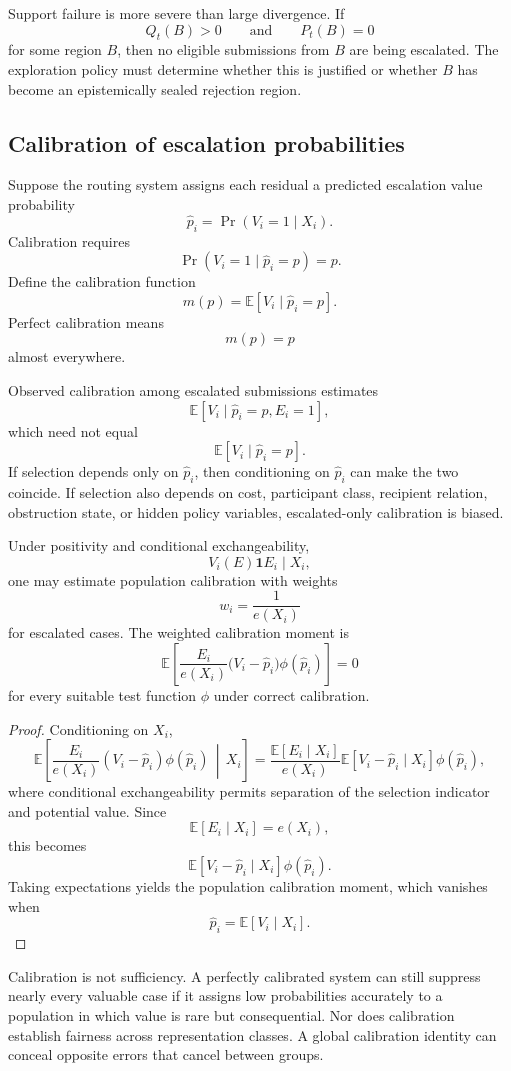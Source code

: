 \documentclass[11pt]{article}
\theoremstyle{definition}
\DeclareMathOperator{\Prob}{Pr}
\newcommand{\E}{\mathbb{E}}
\newcommand{\given}{\,\middle|\,}
\newcommand{\ind}{\mathbf{1}}
\begin{document}
Support failure is more severe than large divergence. If
\[
Q_t(B)>0
\qquad\text{and}\qquad
P_t(B)=0
\]
for some region \(B\), then no eligible submissions from \(B\) are being escalated. The exploration policy must determine whether this is justified or whether \(B\) has become an epistemically sealed rejection region.

\subsection{Calibration of escalation probabilities}

Suppose the routing system assigns each residual a predicted escalation value probability
\[
\widehat p_i
=
\Prob(V_i=1\mid X_i).
\]
Calibration requires
\[
\Prob(V_i=1\mid \widehat p_i=p)=p.
\]
Define the calibration function
\[
m(p)
=
\E[V_i\mid\widehat p_i=p].
\]
Perfect calibration means
\[
m(p)=p
\]
almost everywhere.

Observed calibration among escalated submissions estimates
\[
\E[V_i\mid\widehat p_i=p,E_i=1],
\]
which need not equal
\[
\E[V_i\mid\widehat p_i=p].
\]
If selection depends only on \(\widehat p_i\), then conditioning on \(\widehat p_i\) can make the two coincide. If selection also depends on cost, participant class, recipient relation, obstruction state, or hidden policy variables, escalated-only calibration is biased.

Under positivity and conditional exchangeability,
\[
V_i(E)\ind E_i\mid X_i,
\]
one may estimate population calibration with weights
\[
w_i
=
\frac{1}{e(X_i)}
\]
for escalated cases. The weighted calibration moment is
\[
\E\!\left[
\frac{E_i}{e(X_i)}
\bigl(
V_i-\widehat p_i
\bigr)
\phi(\widehat p_i)
\right]
=
0
\]
for every suitable test function \(\phi\) under correct calibration.

\begin{proof}
Conditioning on \(X_i\),
\[
\E\!\left[
\frac{E_i}{e(X_i)}
(V_i-\widehat p_i)
\phi(\widehat p_i)
\given X_i
\right]
=
\frac{\E[E_i\mid X_i]}{e(X_i)}
\E[
V_i-\widehat p_i
\mid X_i
]
\phi(\widehat p_i),
\]
where conditional exchangeability permits separation of the selection indicator and potential value. Since
\[
\E[E_i\mid X_i]=e(X_i),
\]
this becomes
\[
\E[
V_i-\widehat p_i
\mid X_i
]
\phi(\widehat p_i).
\]
Taking expectations yields the population calibration moment, which vanishes when
\[
\widehat p_i=\E[V_i\mid X_i].
\]
\end{proof}

Calibration is not sufficiency. A perfectly calibrated system can still suppress nearly every valuable case if it assigns low probabilities accurately to a population in which value is rare but consequential. Nor does calibration establish fairness across representation classes. A global calibration identity can conceal opposite errors that cancel between groups.
\end{document}
